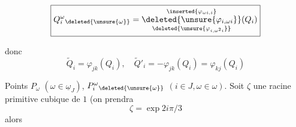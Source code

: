 
\[
\boxed{Q_i^\omega{}_{\deleted{\unsure{\omega}}}=
\underset{\deleted{\unsure{\varphi_{i,\omega^2i}}}}
{\overset{\inserted{\varphi_{\omega i,i}}}
{\deleted{\unsure{\varphi_{i,\omega i}}}}}(Q_i)}
\]


donc
\[
\widetilde{Q}_i=\varphi_{jk}(Q_i),\quad
\widetilde{Q}'_i=-\varphi_{jk}(Q_i)=\varphi_{kj}(Q_i)
\]

Points $P_\omega$ $(\omega\in\underline{\omega}_J)$,
$P_i^\omega{}_{\deleted{\unsure{\omega}}}$ $(i\in J,\omega\in\omega)$.
Soit $\zeta$ une \deleted{$\unsure{\zeta}$} racine primitive cubique de $1$ (on prendra \deleted{$\unsure{\zeta}$}
\[
\zeta=\exp 2i\pi/3
\]
alors

